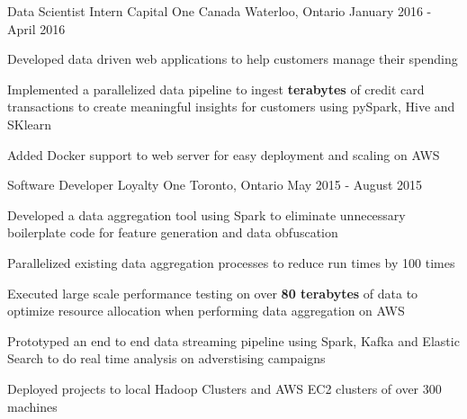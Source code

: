 \begin{cventries}

\cventry
{Data Scientist Intern}
{Capital One Canada}
{Waterloo, Ontario}
{January 2016 - April 2016}
{ %
\begin{cvitems}
\item {Developed data driven web applications to help customers manage their spending}
\item {Implemented a parallelized data pipeline to ingest \textbf{terabytes} of credit card transactions to create meaningful insights for customers using pySpark, Hive and SKlearn}
\item {Added Docker support to web server for easy deployment and scaling on AWS}
\end{cvitems}
}


\cventry
{Software Developer}
{Loyalty One} %
{Toronto, Ontario} %
{May 2015 - August 2015} %
{
\begin{cvitems}
\item {Developed a data aggregation tool using Spark to eliminate unnecessary boilerplate code for feature generation and data obfuscation}
\item {Parallelized existing data aggregation processes to reduce run times by 100 times}
\item {Executed large scale performance testing on over \textbf{80 terabytes} of data to optimize resource allocation when performing data aggregation on AWS}
\item {Prototyped an end to end data streaming pipeline using Spark, Kafka and Elastic Search to do real time analysis on adverstising campaigns}
\item {Deployed projects to local Hadoop Clusters and AWS EC2 clusters of over 300 machines}
\end{cvitems}
}


\end{cventries}
